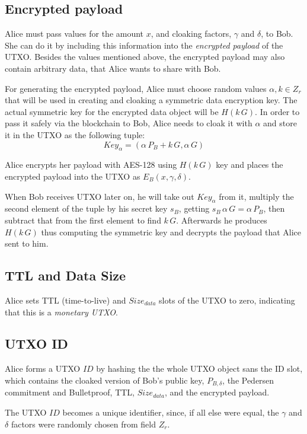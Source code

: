 \documentclass[8pt,fleqn,openany]{book}
\begin{document}
{\subsection{Encrypted payload} Alice must pass values for the amount $x$, and cloaking factors, $\gamma$ and $\delta$, to Bob. She can do it by including this information into the \textit{encrypted payload} of the UTXO. Besides the values mentioned above, the encrypted payload may also contain arbitrary data, that Alice wants to share with Bob. 

For generating the encrypted payload, Alice must choose random values $\alpha, k \in Z_r$ that will be used in creating and cloaking a symmetric data encryption key.
The actual symmetric key for the encrypted data object will be $H(k \, G)$. In order to pass it safely via the blockchain to Bob, Alice needs to cloak it with $\alpha$ and store it in the UTXO as the following tuple: $$\mathit{Key}_{\alpha} = (\alpha \, P_{B} + k \, G, \alpha \, G )$$ 

Alice encrypts her payload with AES-128 using $H(k \, G)$ key and places the encrypted payload into the UTXO as $E_B(x, \gamma, \delta)$.

When Bob receives UTXO later on, he will take out $\mathit{Key}_{\alpha}$ from it, multiply the second element of the tuple by his secret key $s_B$, getting $s_B \, \alpha \, G = \alpha \, P_B$, then subtract that from the first element to find $k \, G$. Afterwards he produces $H(k \, G)$ thus computing the symmetric key and decrypts the payload that Alice sent to him.

\subsection{TTL and Data Size} Alice sets TTL (time-to-live) and $Size_{data}$ slots of the UTXO to zero, indicating that this is a \textit{monetary UTXO}. 

\subsection{UTXO ID} Alice forms a UTXO $\mathit{ID}$ by hashing the the whole UTXO object sans the ID slot, which contains the cloaked version of Bob’s public key, $P_{B, \delta}$, the Pedersen commitment and Bulletproof, TTL, $Size_{data}$, and the encrypted payload.

The UTXO $\mathit{ID}$ becomes a unique identifier, since, if all else were equal, the $\gamma$ and $\delta$ factors were randomly chosen from field $Z_r$.

}
\end{document}
